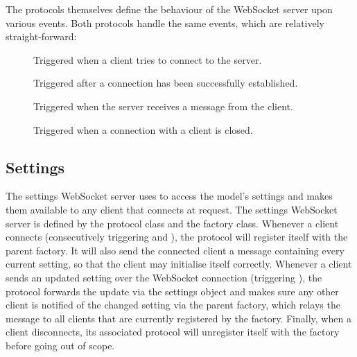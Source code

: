 \documentclass[a4paper, openany, oneside]{memoir}
\begin{document}
The protocols themselves define the behaviour of the WebSocket server upon various events. Both protocols handle the same events, which are relatively straight-forward:
\begin{description}
	\item[] Triggered when a client tries to connect to the server.
	\item[] Triggered after a connection has been successfully established.
	\item[] Triggered when the server receives a message from the client.
	\item[] Triggered when a connection with a client is closed.
\end{description}

\subsection{Settings}
\label{sub:websocket_settings}
The settings WebSocket server uses  to access the model's settings and makes them available to any client that connects at request. The settings WebSocket server is defined by the  protocol class and the  factory class.
Whenever a client connects (consecutively triggering  and ), the protocol will register itself with the parent factory. It will also send the connected client a message containing every current setting, so that the client may initialise itself correctly. Whenever a client sends an updated setting over the WebSocket connection (triggering ), the protocol forwards the update via the  settings object and makes sure any other client is notified of the changed setting via the parent factory, which relays the message to all clients that are currently registered by the factory. Finally, when a client disconnects, its associated protocol will unregister itself with the factory before going out of scope.
\end{document}
